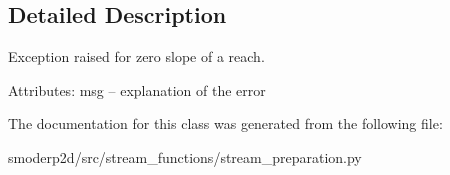 \subsection{Detailed Description}
\begin{DoxyVerb}Exception raised for zero slope of a reach.

Attributes:
    msg  -- explanation of the error
\end{DoxyVerb}
 

The documentation for this class was generated from the following file\-:\begin{DoxyCompactItemize}
\item 
smoderp2d/src/stream\-\_\-functions/stream\-\_\-preparation.\-py\end{DoxyCompactItemize}
